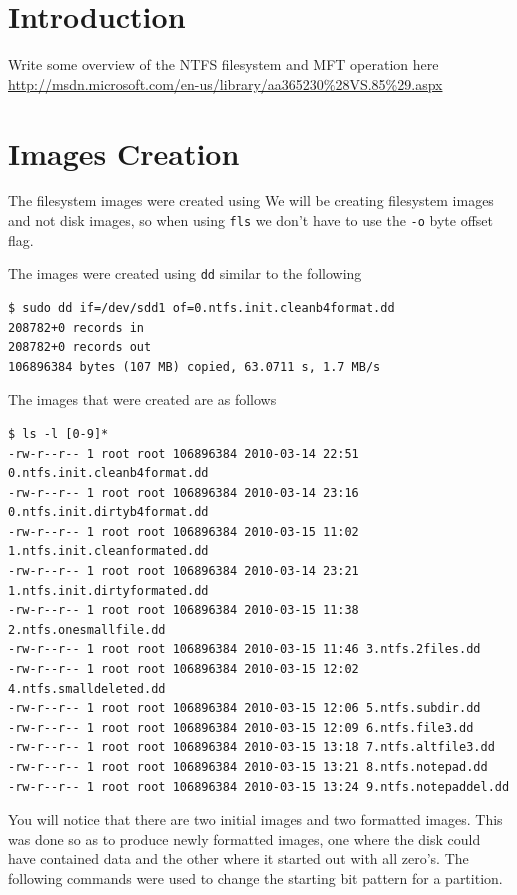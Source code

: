 \documentclass[a4paper,
    11pt,
    normalheadings,
    parindent,
    UKenglish,
    abstracton,
    ]{scrartcl}
\title{\mytitle{}}
\author{
    cand. Dipl. Inf. Tobias Müller <\href{mailto:muellet2@computing.dcu.ie?subject=ss10-forensic-lab01}{muellet2@}>, 59212333 \and
    BSc. Anthony Walters <\href{mailto:waltera3@computing.dcu.ie?subject=ss10-forensic-lab01}{waltera3@}>, 59213102
    }
\date{\today}
\begin{document}
\maketitle


\section{Introduction}
Write some overview of the NTFS filesystem and MFT operation here
\url{http://msdn.microsoft.com/en-us/library/aa365230%28VS.85%29.aspx}


\section{Images Creation}
The filesystem images were created using
We will be creating filesystem images and not disk images, so when using \texttt{fls} we don't have to use the \texttt{-o} byte offset flag.

The images were created using \texttt{dd} similar to the following
\begin{verbatim}
$ sudo dd if=/dev/sdd1 of=0.ntfs.init.cleanb4format.dd
208782+0 records in
208782+0 records out
106896384 bytes (107 MB) copied, 63.0711 s, 1.7 MB/s
\end{verbatim}

The images that were created are as follows
\begin{verbatim}
$ ls -l [0-9]*
-rw-r--r-- 1 root root 106896384 2010-03-14 22:51 0.ntfs.init.cleanb4format.dd
-rw-r--r-- 1 root root 106896384 2010-03-14 23:16 0.ntfs.init.dirtyb4format.dd
-rw-r--r-- 1 root root 106896384 2010-03-15 11:02 1.ntfs.init.cleanformated.dd
-rw-r--r-- 1 root root 106896384 2010-03-14 23:21 1.ntfs.init.dirtyformated.dd
-rw-r--r-- 1 root root 106896384 2010-03-15 11:38 2.ntfs.onesmallfile.dd
-rw-r--r-- 1 root root 106896384 2010-03-15 11:46 3.ntfs.2files.dd
-rw-r--r-- 1 root root 106896384 2010-03-15 12:02 4.ntfs.smalldeleted.dd
-rw-r--r-- 1 root root 106896384 2010-03-15 12:06 5.ntfs.subdir.dd
-rw-r--r-- 1 root root 106896384 2010-03-15 12:09 6.ntfs.file3.dd
-rw-r--r-- 1 root root 106896384 2010-03-15 13:18 7.ntfs.altfile3.dd
-rw-r--r-- 1 root root 106896384 2010-03-15 13:21 8.ntfs.notepad.dd
-rw-r--r-- 1 root root 106896384 2010-03-15 13:24 9.ntfs.notepaddel.dd
\end{verbatim}

You will notice that there are two initial images and two formatted images. This was done so as to produce newly formatted images, one where the disk could have contained data and the other where it started out with all zero's. The following commands were used to change the starting bit pattern for a partition.
\end{document}
